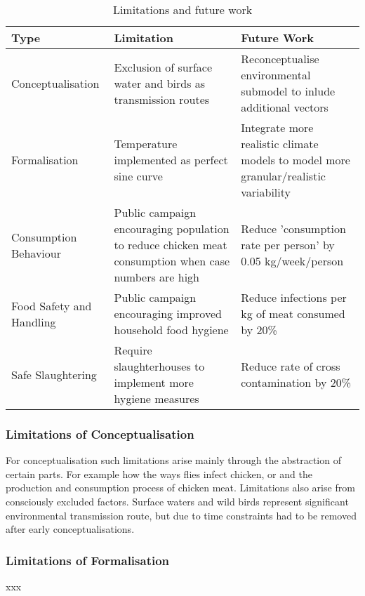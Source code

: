 \begin{table}[h!]
\centering
\caption{Limitations and future work}
\begin{tabular}{ l  p{4cm}  p{4cm}}
\hline
Type &
   Limitation &
  Future Work \\ \hline
Conceptualisation &
  Exclusion of surface water and birds as transmission routes &
  Reconceptualise environmental submodel to inlude additional vectors \\
Formalisation &
  Temperature implemented as perfect sine curve&
  Integrate more realistic climate models to model more granular/realistic variability \\
Consumption Behaviour &
  Public campaign encouraging population to reduce chicken meat consumption when case numbers are high &
  Reduce 'consumption rate per person' by 0.05 kg/week/person \\
Food Safety and Handling &
  Public campaign encouraging improved household food hygiene &
  Reduce infections per kg of meat consumed by 20\% \\
Safe Slaughtering &
  Require slaughterhouses to implement more hygiene measures &
  Reduce rate of cross contamination by 20\%
\end{tabular}
\label{tab:limitations}
\end{table}

\subsubsection{Limitations of Conceptualisation}

For conceptualisation such limitations arise mainly through the abstraction of certain parts. For example how the ways flies infect chicken, or and the production and consumption process of chicken meat. Limitations also arise from consciously excluded factors. Surface waters and wild birds represent significant environmental transmission route, but due to time constraints had to be removed after early conceptualisations. 


\subsubsection{Limitations of Formalisation}
xxx

